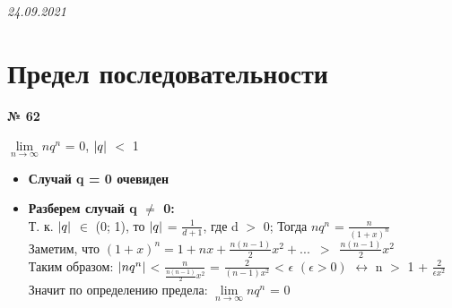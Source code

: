 \documentclass[12pt]{article}
\DeclarePairedDelimiter\abs{\lvert}{\rvert}%
\begin{document}
	{\hspace*{\fill} {\textit{24.09.2021}}}
	\section{Предел последовательности}
	 \vspace{1cm}
	{
		{\textbf{№ 62}\\ \par}
		
		{\large $\lim\limits_{n \to \infty} n q^n$} = 0, \enspace $\abs{q}$ $<$ 1\\\par
		\begin{itemize}
			\item {
				\textbf{Случай q = 0 очевиден}
			}
			\item {
				\textbf{Разберем случай q $\neq$ 0:}\\
				Т. к. $\abs{q}$ $\in$ (0; 1), то  $\abs{q}$ = $\frac{1}{d + 1}$, где d $>$ 0;
				Тогда $n q^n$ = $\frac{n}{(1 + x)^n}$\vspace{.1cm}\\
				Заметим, что $(1 + x)^n=1+nx+\frac{n(n-1)}{2}x^2+... \enspace > \enspace \frac{n(n-1)}{2}x^2$\vspace{.1cm}\\
				Таким образом: $\abs{nq^n}$ < $\frac{n}{\frac{n(n-1)}{2}x^2}$ = $\frac{2}{(n-1)x^2}$ < $\epsilon$
				$(\epsilon > 0)$ $\leftrightarrow$ 
				n $>$ 1 + $\frac{2}{\epsilon x^2}$\\
				Значит по определению предела: $\lim\limits_{n \to \infty} n q^n$ = 0
			}
			
		\end{itemize}
	}
	
\end{document}
